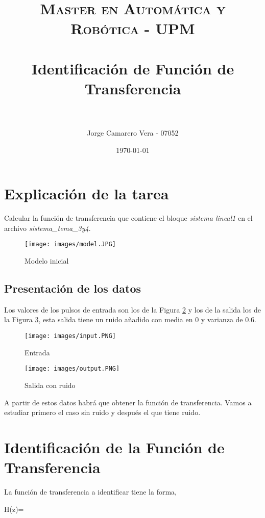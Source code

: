 \documentclass[a4paper, fontsize=11pt]{scrartcl} %
\title{	
	\normalfont \normalsize 
	\textsc{Master en Automática y Robótica - UPM} \\ [25pt] %
	\horrule{0.5pt} \\[0.4cm] %
	\huge Identificación de Función de Transferencia \\ %
	\horrule{2pt} \\[0.5cm] %
}
\author{Jorge Camarero Vera - 07052} %
\date{\normalsize\today} %
\numberwithin{equation}{section} %
\numberwithin{figure}{section} %
\numberwithin{table}{section} %
\newenvironment{myalign}{\par\nobreak\large\noindent\align}{\endalign} %
\begin{document}
	\maketitle
	
	\section{Explicación de la tarea}
	
	Calcular la función de transferencia que contiene el bloque \textit{sistema lineal1} en el archivo \textit{sistema\_tema\_3y4}. 
	
	\begin{figure}[h!]
		\centering
		\texttt{[image: images/model.JPG]}
		\caption{Modelo inicial}
		\label{Modelo Inicial}
	\end{figure}
	\FloatBarrier
	
	\subsection{Presentación de los datos}
	
	Los valores de los pulsos de entrada son los de la Figura \ref{Entrada} y los de la salida los de la Figura \ref{Salida con ruido}, esta salida tiene un ruido añadido con media en 0 y varianza de 0.6.
	
	\begin{figure}[h!]
		\centering
		\texttt{[image: images/input.PNG]}
		\caption{Entrada}
		\label{Entrada}
	\end{figure}
	\FloatBarrier
	
	\begin{figure}[h!]
		\centering
		\texttt{[image: images/output.PNG]}
		\caption{Salida con ruido}
		\label{Salida con ruido}
	\end{figure}
	\FloatBarrier
	
	A partir de estos datos habrá que obtener la función de transferencia. Vamos a estudiar primero el caso sin ruido y después el que tiene ruido.

	\section{Identificación de la Función de Transferencia}	
	
	La función de transferencia a identificar tiene la forma,
	
	\begin{myalign}
		H(z)=
		\label{Transfer Function}
	\end{myalign}
	
\end{document}
